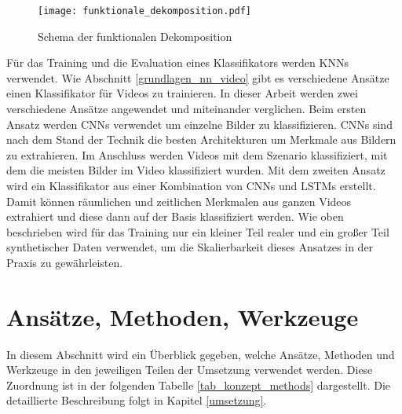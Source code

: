 \begin{figure}[h]
\centering
\texttt{[image: funktionale\_dekomposition.pdf]}
\caption{Schema der funktionalen Dekomposition \cite{amersbach2017functional}}
\label{fig_functional_decomposition}
\end{figure}

Für das Training und die Evaluation eines Klassifikators werden \acp{KNN} verwendet. Wie Abschnitt \ref{grundlagen_nn_video} gibt es verschiedene Ansätze einen Klassifikator für Videos zu trainieren. In dieser Arbeit werden zwei verschiedene Ansätze angewendet und miteinander verglichen. Beim ersten Ansatz werden \acp{CNN} verwendet um einzelne Bilder zu klassifizieren. \acp{CNN} sind nach dem Stand der Technik die besten Architekturen um Merkmale aus Bildern zu extrahieren. Im Anschluss werden Videos mit dem Szenario klassifiziert, mit dem die meisten Bilder im Video klassifiziert wurden. Mit dem zweiten Ansatz wird ein Klassifikator aus einer Kombination von \acp{CNN} und \acp{LSTM} erstellt. Damit können räumlichen und zeitlichen Merkmalen aus ganzen Videos extrahiert und diese dann auf der Basis klassifiziert werden. Wie oben beschrieben wird für das Training nur ein kleiner Teil realer und ein großer Teil synthetischer Daten verwendet, um die Skalierbarkeit dieses Ansatzes in der Praxis zu gewährleisten.
 

\section{Ansätze, Methoden, Werkzeuge}
\label{konzept_methodik}

In diesem Abschnitt wird ein Überblick gegeben, welche Ansätze, Methoden und Werkzeuge in den jeweiligen Teilen der Umsetzung verwendet werden. Diese Zuordnung ist in der folgenden Tabelle \ref{tab_konzept_methods} dargestellt. Die detaillierte Beschreibung folgt in Kapitel \ref{umsetzung}.

